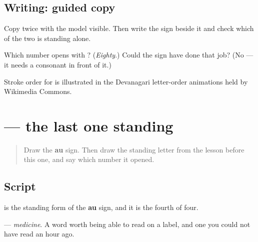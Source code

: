 \subsection*{Writing: guided copy}

Copy \textbf{} twice with the model visible. Then write the \textbf{} sign beside it and check which of the two is standing alone.

\begin{tcolorbox}[breakable,colback=teal!4,colframe=teal!35!black,title={Before you move on}]
Which number opens with \textbf{}? (\emph{Eighty}.) Could the \textbf{} sign have done that job? (No — it needs a consonant in front of it.)

Stroke order for \textbf{} is illustrated in the Devanagari letter-order animations held by Wikimedia Commons.
\end{tcolorbox}
\section[\texorpdfstring{\mr{औ} (au)}{औ (au)}]{ — the last one standing}

\label{lesson:MR-W65-au-independent}



\begin{quote}
Draw the \textbf{au} sign. Then draw the standing letter from the lesson before this one, and say which number it opened.
\end{quote}

\subsection*{Script}
\begin{quote}
\end{quote}

\textbf{} is the standing form of the \textbf{au} sign, and it is the fourth of four.

\textbf{} — \emph{medicine}. A word worth being able to read on a label, and one you could not have read an hour ago.

